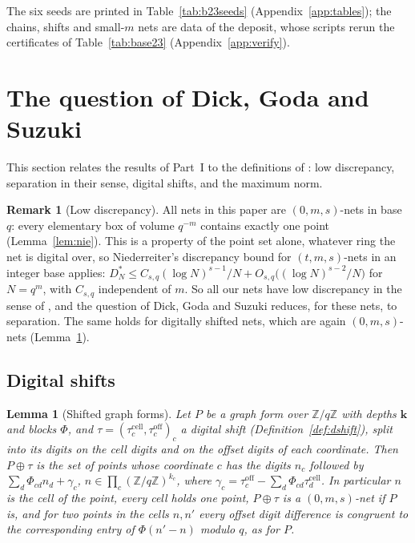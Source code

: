 \documentclass[11pt]{amsart}
\newtheorem{lemma}[theorem]{Lemma}
\theoremstyle{definition}
\newtheorem{remark}[theorem]{Remark}
\theoremstyle{plain}
\newcommand{\Z}{\mathbb{Z}}
\begin{document}
The six seeds are printed in Table~\ref{tab:b23seeds} (Appendix~\ref{app:tables}); the chains, shifts and small-$m$ nets are data of the deposit, whose scripts rerun the certificates of Table~\ref{tab:base23} (Appendix~\ref{app:verify}).

\section{The question of Dick, Goda and Suzuki}\label{sec:dgs}
This section relates the results of Part~I to the definitions of \cite{DGS2}: low discrepancy, separation in their sense, digital shifts, and the maximum norm.

\begin{remark}[Low discrepancy]\label{rem:lowdisc}
All nets in this paper are $(0,m,s)$-nets in base $q$: every elementary box of volume $q^{-m}$ contains exactly one point (Lemma~\ref{lem:nie}). This is a property of the point set alone, whatever ring the net is digital over, so Niederreiter's discrepancy bound for $(t,m,s)$-nets in an integer base \cite{Nie87} applies: $D^*_N\le C_{s,q}(\log N)^{s-1}/N+O_{s,q}\bigl((\log N)^{s-2}/N\bigr)$ for $N=q^m$, with $C_{s,q}$ independent of $m$. So all our nets have low discrepancy in the sense of \cite{DGS2,DGLPS1}, and the question of Dick, Goda and Suzuki reduces, for these nets, to separation. The same holds for digitally shifted nets, which are again $(0,m,s)$-nets (Lemma~\ref{lem:shift}).
\end{remark}

\subsection{Digital shifts}
\begin{lemma}[Shifted graph forms]\label{lem:shift}
Let $P$ be a graph form over $\Z/q\Z$ with depths $\mathbf k$ and blocks $\Phi$, and $\tau=(\tau^{\mathrm{cell}}_c,\tau^{\mathrm{off}}_c)_c$ a digital shift (Definition~\ref{def:dshift}), split into its digits on the cell digits and on the offset digits of each coordinate. Then $P\oplus\tau$ is the set of points whose coordinate $c$ has the digits $n_c$ followed by $\sum_d\Phi_{cd}n_d+\gamma_c$, $n\in\prod_c(\Z/q\Z)^{k_c}$, where $\gamma_c=\tau^{\mathrm{off}}_c-\sum_d\Phi_{cd}\tau^{\mathrm{cell}}_d$. In particular $n$ is the cell of the point, every cell holds one point, $P\oplus\tau$ is a $(0,m,s)$-net if $P$ is, and for two points in the cells $n,n'$ every offset digit difference is congruent to the corresponding entry of $\Phi(n'-n)$ modulo $q$, as for $P$.
\end{lemma}
\end{document}

